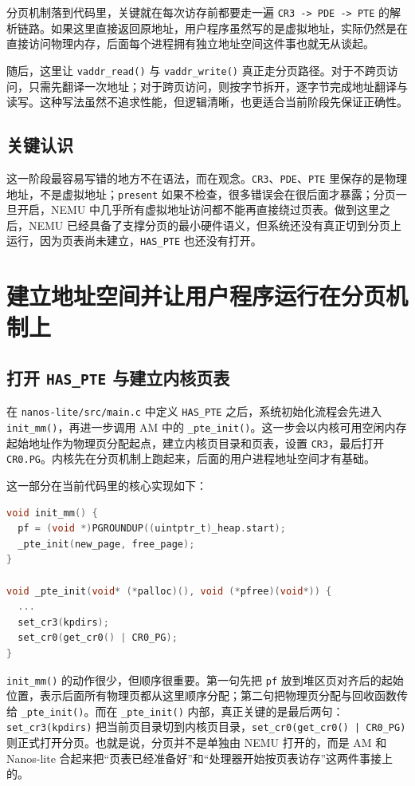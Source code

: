 \documentclass[a4paper]{article}
\begin{document}
分页机制落到代码里，关键就在每次访存前都要走一遍 \texttt{CR3 -> PDE -> PTE} 的解析链路。如果这里直接返回原地址，用户程序虽然写的是虚拟地址，实际仍然是在直接访问物理内存，后面每个进程拥有独立地址空间这件事也就无从谈起。

随后，这里让 \texttt{vaddr\_read()} 与 \texttt{vaddr\_write()} 真正走分页路径。对于不跨页访问，只需先翻译一次地址；对于跨页访问，则按字节拆开，逐字节完成地址翻译与读写。这种写法虽然不追求性能，但逻辑清晰，也更适合当前阶段先保证正确性。

\subsection{关键认识}
这一阶段最容易写错的地方不在语法，而在观念。\texttt{CR3}、\texttt{PDE}、\texttt{PTE} 里保存的是物理地址，不是虚拟地址；\texttt{present} 如果不检查，很多错误会在很后面才暴露；分页一旦开启，NEMU 中几乎所有虚拟地址访问都不能再直接绕过页表。做到这里之后，NEMU 已经具备了支撑分页的最小硬件语义，但系统还没有真正切到分页上运行，因为页表尚未建立，\texttt{HAS\_PTE} 也还没有打开。

\section{建立地址空间并让用户程序运行在分页机制上}

\subsection{打开 \texttt{HAS\_PTE} 与建立内核页表}
在 \texttt{nanos-lite/src/main.c} 中定义 \texttt{HAS\_PTE} 之后，系统初始化流程会先进入 \texttt{init\_mm()}，再进一步调用 AM 中的 \texttt{\_pte\_init()}。这一步会以内核可用空闲内存起始地址作为物理页分配起点，建立内核页目录和页表，设置 \texttt{CR3}，最后打开 \texttt{CR0.PG}。内核先在分页机制上跑起来，后面的用户进程地址空间才有基础。

这一部分在当前代码里的核心实现如下：
\begin{lstlisting}[language=C]
void init_mm() {
  pf = (void *)PGROUNDUP((uintptr_t)_heap.start);
  _pte_init(new_page, free_page);
}

void _pte_init(void* (*palloc)(), void (*pfree)(void*)) {
  ...
  set_cr3(kpdirs);
  set_cr0(get_cr0() | CR0_PG);
}
\end{lstlisting}

\texttt{init\_mm()} 的动作很少，但顺序很重要。第一句先把 \texttt{pf} 放到堆区页对齐后的起始位置，表示后面所有物理页都从这里顺序分配；第二句把物理页分配与回收函数传给 \texttt{\_pte\_init()}。而在 \texttt{\_pte\_init()} 内部，真正关键的是最后两句：\texttt{set\_cr3(kpdirs)} 把当前页目录切到内核页目录，\texttt{set\_cr0(get\_cr0() | CR0\_PG)} 则正式打开分页。也就是说，分页并不是单独由 NEMU 打开的，而是 AM 和 Nanos-lite 合起来把“页表已经准备好”和“处理器开始按页表访存”这两件事接上的。
\end{document}
